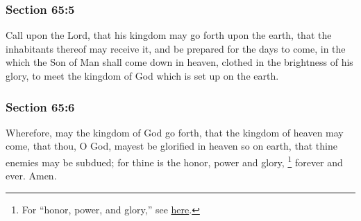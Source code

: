 	\subsubsection{Section 65:5} %
		\label{DC65-5}

		Call upon the Lord, that his kingdom may go forth upon the earth, that the inhabitants thereof may receive it, and be prepared for the days to come, in the which the Son of Man shall come down in heaven, clothed in the brightness of his glory, to meet the kingdom of God which is set up on the earth.


	\subsubsection{Section 65:6} %
		\label{DC65-6}

		Wherefore, may the kingdom of God go forth, that the kingdom of heaven may come, that thou, O God, mayest be glorified in heaven so on earth, that thine enemies may be subdued; for thine is the honor, power and glory,%
			\footnote{%
				For ``honor, power, and glory,'' see \hyperref[HONOR-PHRASES]{here}.
				}
		forever and ever.  Amen.

